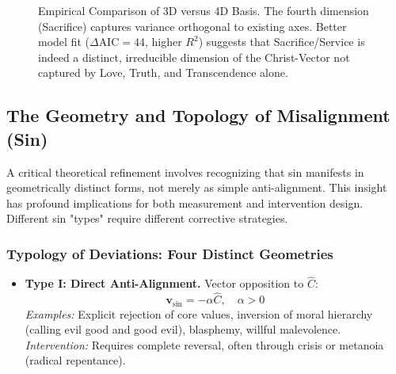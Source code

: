 \documentclass[11pt,a4paper]{article}
\theoremstyle{definition}
\theoremstyle{remark}
\begin{document}
\begin{small}
\begin{figure}[h!]
    \caption{Empirical Comparison of 3D versus 4D Basis. The fourth dimension (Sacrifice) captures variance orthogonal to existing axes. Better model fit (\(\Delta \text{AIC} = 44\), higher \(R^2\)) suggests that Sacrifice/Service is indeed a distinct, irreducible dimension of the Christ-Vector not captured by Love, Truth, and Transcendence alone.}
    \label{fig:basis_comparison}
\end{figure}

\subsection{The Geometry and Topology of Misalignment (Sin)}

A critical theoretical refinement involves recognizing that sin manifests in geometrically distinct forms, not merely as simple anti-alignment. This insight has profound implications for both measurement and intervention design. Different sin "types" require different corrective strategies.

\subsubsection{Typology of Deviations: Four Distinct Geometries}

\begin{itemize}
    \item \textbf{Type I: Direct Anti-Alignment.} Vector opposition to \(\hat{C}\):
    \begin{equation}
        \mathbf{v}_{\text{sin}} = -\alpha \hat{C}, \quad \alpha > 0
    \end{equation}
    \textit{Examples:} Explicit rejection of core values, inversion of moral hierarchy (calling evil good and good evil), blasphemy, willful malevolence.\\
    \textit{Intervention:} Requires complete reversal, often through crisis or metanoia (radical repentance).
    

\end{itemize}
\end{small}
\end{document}
